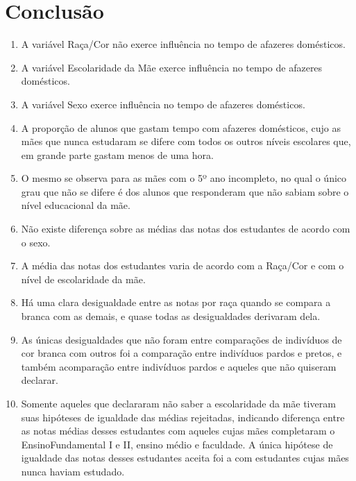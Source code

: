 
\chapter{Conclusão}


\begin{enumerate}[label=(\alph*)]

\item A variável Raça/Cor não exerce influência no tempo de afazeres domésticos.
\item A variável Escolaridade da Mãe exerce influência no tempo de afazeres domésticos.
\item A variável Sexo exerce influência no tempo de afazeres domésticos.
\item A proporção de alunos que gastam tempo com afazeres domésticos, cujo as mães que nunca estudaram se difere com todos os outros níveis escolares que, em grande parte gastam menos de uma hora.
\item O mesmo se observa para as mães com o 5º ano incompleto, no qual o único grau que não se difere é dos alunos que responderam que não sabiam sobre o nível educacional da mãe.
\item Não existe diferença sobre as médias das notas dos estudantes de acordo com o sexo.
\item A média das notas dos estudantes varia de acordo com a Raça/Cor e com o nível de escolaridade da mãe.
\item Há uma clara desigualdade entre as notas por raça quando se compara a branca com as demais, e quase todas as desigualdades derivaram dela.
\item As únicas desigualdades que não foram entre comparações de indivíduos de cor branca com outros foi a comparação entre indivíduos pardos e pretos, e também acomparação entre indivíduos pardos e aqueles que não quiseram declarar.
\item Somente aqueles que declararam não saber a escolaridade da mãe tiveram suas hipóteses de igualdade das médias rejeitadas, indicando diferença entre as notas médias desses estudantes com aqueles cujas mães completaram o EnsinoFundamental I e II, ensino médio e faculdade. A única hipótese de igualdade das notas desses estudantes aceita foi a com estudantes cujas mães nunca haviam estudado.


\end{enumerate}